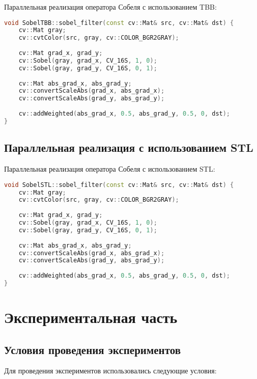 \documentclass[]{article}
\theoremstyle{remark}
\theoremstyle{definition}
\begin{document}
\par Параллельная реализация оператора Собеля с использованием TBB:

\begin{lstlisting}[language=C++]
void SobelTBB::sobel_filter(const cv::Mat& src, cv::Mat& dst) {
    cv::Mat gray;
    cv::cvtColor(src, gray, cv::COLOR_BGR2GRAY);
    
    cv::Mat grad_x, grad_y;
    cv::Sobel(gray, grad_x, CV_16S, 1, 0);
    cv::Sobel(gray, grad_y, CV_16S, 0, 1);
    
    cv::Mat abs_grad_x, abs_grad_y;
    cv::convertScaleAbs(grad_x, abs_grad_x);
    cv::convertScaleAbs(grad_y, abs_grad_y);
    
    cv::addWeighted(abs_grad_x, 0.5, abs_grad_y, 0.5, 0, dst);
}
\end{lstlisting}

\subsection{Параллельная реализация с использованием STL}

\par Параллельная реализация оператора Собеля с использованием STL:

\begin{lstlisting}[language=C++]
void SobelSTL::sobel_filter(const cv::Mat& src, cv::Mat& dst) {
    cv::Mat gray;
    cv::cvtColor(src, gray, cv::COLOR_BGR2GRAY);
    
    cv::Mat grad_x, grad_y;
    cv::Sobel(gray, grad_x, CV_16S, 1, 0);
    cv::Sobel(gray, grad_y, CV_16S, 0, 1);
    
    cv::Mat abs_grad_x, abs_grad_y;
    cv::convertScaleAbs(grad_x, abs_grad_x);
    cv::convertScaleAbs(grad_y, abs_grad_y);
    
    cv::addWeighted(abs_grad_x, 0.5, abs_grad_y, 0.5, 0, dst);
}
\end{lstlisting}

\newpage

\section{Экспериментальная часть}

\subsection{Условия проведения экспериментов}

\par Для проведения экспериментов использовались следующие условия:
\end{document}
